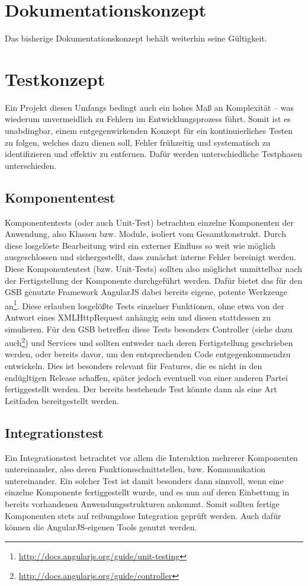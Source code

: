\section{Dokumentationskonzept}

Das bisherige Dokumentationskonzept behält weiterhin seine Gültigkeit.

\section{Testkonzept }

Ein Projekt diesen Umfangs bedingt auch ein hohes Maß an Komplexität -- was wiederum unvermeidlich zu Fehlern im Entwicklungsprozess führt. Somit ist es unabdingbar, einem entgegenwirkenden Konzept für ein kontinuierliches Testen zu folgen, welches dazu dienen soll, Fehler frühzeitig und systematisch zu identifizieren und effektiv zu entfernen. Dafür werden unterschiedliche Testphasen unterschieden.

\subsection*{Komponententest}
Komponententests (oder auch Unit-Test) betrachten einzelne Komponenten der Anwendung, also Klassen bzw. Module, isoliert vom Gesamtkonstrukt. Durch diese losgelöste Bearbeitung wird ein externer Einfluss so weit wie möglich ausgeschlossen und sichergestellt, dass zunächst interne Fehler bereinigt werden. Diese Komponententest (bzw. Unit-Tests) sollten also möglichst unmittelbar nach der Fertigstellung der Komponente durchgeführt werden. Dafür bietet das für den GSB genutzte Framework AngularJS dabei bereits eigene, potente Werkzeuge an\footnote{\url{http://docs.angularjs.org/guide/unit-testing}}. Diese erlauben losgelößte Tests einzelner Funktionen, ohne etwa von der Antwort eines XMLHttpRequest anhängig sein und diesen stattdessen zu simulieren. Für den GSB betreffen diese Tests besonders Controller (siehe dazu auch\footnote{\url{http://docs.angularjs.org/guide/controller}}) und Services und sollten entweder nach deren Fertigstellung geschrieben werden, oder bereits davor, um den entsprechenden Code \glqq entgegenkommend\grqq zu entwickeln. Dies ist besonders relevant für Features, die es nicht in den endügltigen Release schaffen, später jedoch eventuell von einer anderen Partei fertiggestellt werden. Der bereits bestehende Test könnte dann als eine Art Leitfaden bereitgestellt werden.%

\subsection*{Integrationstest}
Ein Integrationstest betrachtet vor allem die Interaktion mehrerer Komponenten untereinander, also deren Funktionsschnittstellen, bzw. Kommunikation untereinander. Ein solcher Test ist damit besonders dann sinnvoll, wenn eine einzelne Komponente fertiggestellt wurde, und es nun auf deren Einbettung in bereits vorhandenen Anwendungsstrukturen ankommt. Somit sollten fertige Komponenten stets auf reibungslose Integration geprüft werden. Auch dafür können die AngularJS-eigenen Tools genutzt werden.


